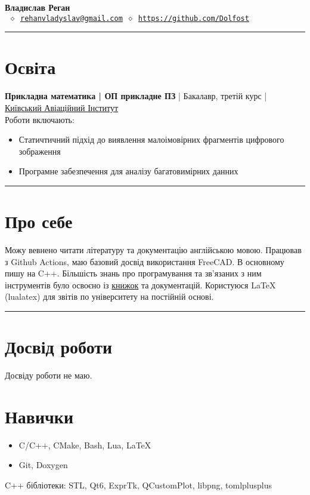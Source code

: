 


\newcommand{\crule}{\par\noindent\rule{\textwidth}{0.5pt}}


\thispagestyle{empty}

\begin{center}
	\LARGE \textbf{Владислав Реган}\\[4mm] \normalsize
	\texttt{ \(\diamond\)\
	\href{mailto:rehanvladyslav@gmail.com}{rehanvladyslav@gmail.com} \(\diamond\)
	\url{https://github.com/Dolfost}}
\end{center}
\crule
\section{Освіта}
\textbf{Прикладна математика | ОП прикладне ПЗ} | Бакалавр, третій курс | \href{http://nau.edu.ua/en/}{Київський Авіаційний Інститут}\\
Роботи включають:
\begin{itemize}
	\item Статичтичний підхід до виявлення малоімовірних фрагментів цифрового зображення
	\item Програмне забезпечення для аналізу багатовимірних данних
\end{itemize}

\crule
\section{Про себе}
Можу вевнено читати літературу та документацію англійською мовою. Працював з
Github Actions, маю базовий досвід використання FreeCAD. В основному пишу на
C++. Більшість знань про програмування та зв'язаних з ним інструментів було
освоєно із
\href{https://github.com/Dolfost/Dolfost/blob/main/README.md#literature--sources}{книжок}
та документацій. Користуюся LaTeX (lualatex) для звітів по університету на
постійній основі.

\crule
\section{Досвід роботи}
Досвіду роботи не маю.

\section{Навички}
\begin{itemize}
	\item C/C++, CMake, Bash, Lua, LaTeX
	\item Git, Doxygen
\end{itemize}
C++ бібліотеки: STL, Qt6, ExprTk, QCustomPlot, libpng, tomlplusplus

